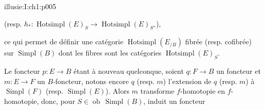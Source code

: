 \begin{illusiebodypage}{illusie:I:ch1:p005}
\hypertarget{illusie:I:ch1:s1:1:eq7}{}%
\noindent{}\par
\noindent\hfill (resp. $h_*:\operatorname{Hotsimpl}(E)_S\longrightarrow
\operatorname{Hotsimpl}(E)_{S''}$),\hfill\mbox{}\par

\hypertarget{illusie:I:ch1:s1:1:p18}{}%
ce qui permet de définir une catégorie $\operatorname{Hotsimpl}(E_{/B})$
fibrée (resp. cofibrée) sur $\operatorname{Simpl}(B)$ dont les fibres sont les
catégories $\operatorname{Hotsimpl}(E)_S$.

\hypertarget{illusie:I:ch1:s1:1:p19}{}%
Le foncteur $p:E\longrightarrow B$ étant à nouveau quelconque, soient
$q:F\longrightarrow B$ un foncteur et $m:E\longrightarrow F$ un $B$-foncteur,
notons encore $q$ (resp. $m$) l'extension de $q$ (resp. $m$) à
$\operatorname{Simpl}(F)$ (resp. $\operatorname{Simpl}(E)$). Alors $m$
transforme $f$-homotopie en $f$-homotopie, donc, pour
$S\in\operatorname{ob}\,\operatorname{Simpl}(B)$, induit un foncteur
\end{illusiebodypage}

